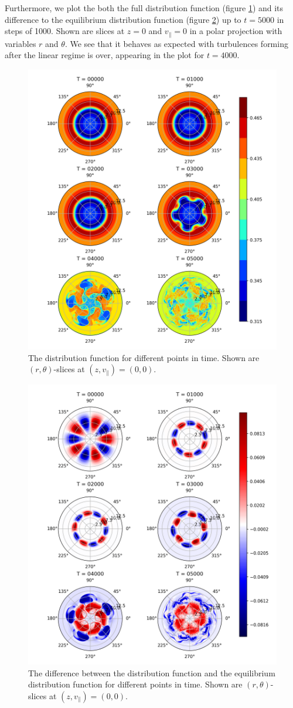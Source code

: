 Furthermore, we plot the both the full distribution function (figure \ref{fig:akwffull}) and its difference to the equilibrium distribution function (figure \ref{fig:akwfdiff}) up to $t=5000$ in steps of 1000. Shown are slices at $z=0$ and $v_\parallel = 0$ in a polar projection with variables $r$ and $\theta$. We see that it behaves as expected with turbulences forming after the linear regime is over, appearing in the plot for $t=4000$.

\begin{figure}
	\centering
	\includegraphics[width=0.7\linewidth]{plots/akw_f_full}
	\caption{The distribution function for different points in time. Shown are $(r,\theta)$-slices at $(z,v_\parallel) = (0,0)$.}
	\label{fig:akwffull}
\end{figure}

\begin{figure}
	\centering
	\includegraphics[width=0.7\linewidth]{plots/akw_f_diff}
	\caption{The difference between the distribution function and the equilibrium distribution function for different points in time. Shown are $(r,\theta)$-slices at $(z,v_\parallel) = (0,0)$.}
	\label{fig:akwfdiff}
\end{figure}



